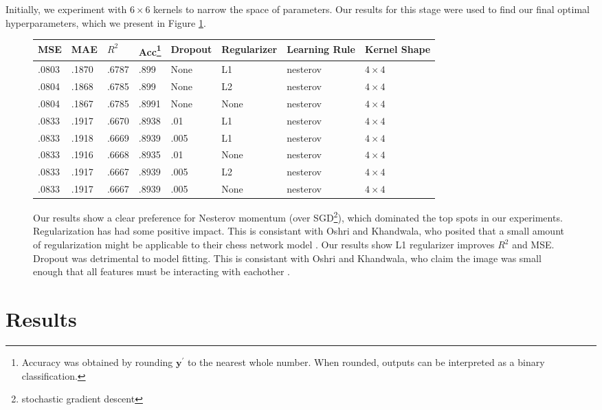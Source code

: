 \documentclass{article}
\begin{document}
Initially, we experiment with $6\times 6$ kernels to narrow the space of parameters.  Our results for this stage were used to find our final optimal hyperparameters, which we present in Figure \ref{fig:paramtable}.

\begin{figure}[ht]
\centering
\begin{tabular}{|l|l|l|l|l|l|l|l|}
\hline
\textbf{MSE} & \textbf{MAE} & \textbf{$R^2$} & \textbf{Acc\footnote{Accuracy was obtained by rounding $\textbf{y}^\prime$ to the nearest whole number.  When rounded, outputs can be interpreted as a binary classification.}} & \textbf{Dropout} & \textbf{Regularizer} & \textbf{Learning Rule} & \textbf{Kernel Shape} \\
\hline
.0803 & .1870 & .6787 & .899 & None & L1 & nesterov & $4\times 4$ \\
.0804 & .1868 & .6785 & .899 & None & L2 & nesterov & $4\times 4$ \\
.0804 & .1867 & .6785 & .8991 & None & None & nesterov & $4\times 4$ \\
.0833 & .1917 & .6670 & .8938 & .01 & L1 & nesterov & $4\times 4$ \\
.0833 & .1918 & .6669 & .8939 & .005 & L1 & nesterov & $4\times 4$ \\
.0833 & .1916 & .6668 & .8935 & .01 & None & nesterov & $4\times 4$ \\
.0833 & .1917 & .6667 & .8939 & .005 & L2 & nesterov & $4\times 4$ \\
.0833 & .1917 & .6667 & .8939 & .005 & None & nesterov & $4\times 4$ \\
\hline
\end{tabular}
\caption{Our results show a clear preference for Nesterov momentum (over SGD\footnote{stochastic gradient descent}), which dominated the top spots in our experiments.  Regularization has had some positive impact.  This is consistant with Oshri and Khandwala, who posited that a small amount of regularization might be applicable to their chess network model \cite{Oshri_Khandwala}. Our results show L1 regularizer improves $R^2$ and MSE.  Dropout was detrimental to model fitting.  This is consistant with Oshri and Khandwala, who claim the image was small enough that all features must be interacting with eachother \cite{Oshri_Khandwala}. \label{fig:paramtable}}
\end{figure}

\section{Results}
\end{document}
